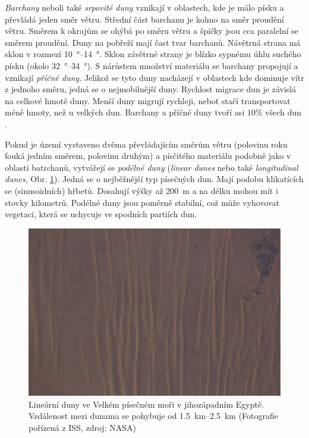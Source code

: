 \emph{Barchany} neboli také \emph{srpovité duny} vznikají v oblastech, kde je málo písku a převládá jeden směr větru. Střední část barchanu je kolmo na směr proudění větru. Směrem k okrajům se ohýbá po směru větru a špičky jsou cca paralelní se směrem proudění. Duny na pobřeží mají čast tvar barchanů. Návětrná strana má sklon v rozmezí \SIrange{10}{14}{\degree}. Sklon závětrné strany je blízko sypnému úhlu suchého písku (okolo \SIrange{32}{34}{\degree}). S nárůstem množství materiálu se barchany propojují a vznikají \emph{příčné duny}. Jelikož se tyto duny nacházejí v oblastech kde dominuje vítr z jednoho směru, jedná se o nejmobilnější duny. Rychlost migrace dun je závislá na celkové hmotě duny. Menší duny migrují rychleji, neboť stačí transportovat méně hmoty, než u velkých dun. Barchany a příčné duny tvoří asi $10 \%$ všech dun \parencite{breedMorphologyDistributionDunes1979}.

Pokud je území vystaveno dvěma převládajícím směrům větru (polovinu roku fouká jedním směrem, polovinu  druhým) a písčitého materiálu podobně jako v oblasti batrchanů, vytvářejí se \emph{podélné duny} (\textit{linear dunes} nebo také \textit{longitudinal dunes}, Obr. \ref{fig:linearniduny}). Jedná se o nejběžnější typ písečných dun. Mají podobu klikatících se (sinusoidních) hřbetů. Dosahují výšky až \SI{200}{\metre} a na délku mohou mít i stovky kilometrů. Podélné duny jsou poměrně stabilní, což může vyhovovat vegetaci, která se uchycuje ve spodních partiích dun.

\begin{figure}
	\centering
	\includegraphics[width=1\linewidth]{obrazky/eolicka/linearniduny}
	\caption{Lineární duny ve Velkém písečném moři v jihozápadním Egyptě. Vzdálenost mezi dunama se pohybuje od \SIrange{1,5}{2,5}{\kilo\metre} (Fotografie pořízená z ISS, zdroj: NASA)}
	\label{fig:linearniduny}
\end{figure}


